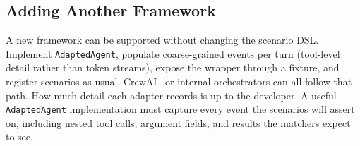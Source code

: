 \subsection{Adding Another Framework}

A new framework can be supported without changing the scenario DSL. Implement \texttt{AdaptedAgent}, populate coarse-grained events per turn (tool-level detail rather than token streams), expose the wrapper through a fixture, and register scenarios as usual. CrewAI~\citep{crewai2024} or internal orchestrators can all follow that path. How much detail each adapter records is up to the developer. A useful \texttt{AdaptedAgent} implementation must capture every event the scenarios will assert on, including nested tool calls, argument fields, and results the matchers expect to see.
